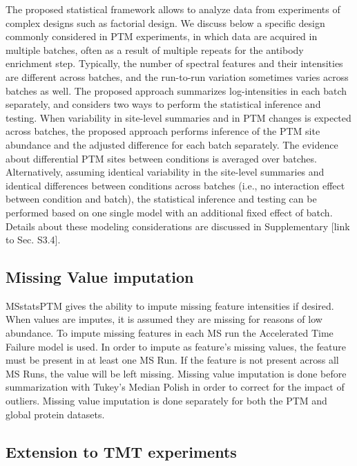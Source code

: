 \documentclass[mcp]{article}
\numberwithin{figure}{section} %
\numberwithin{table}{section}
\def\todo#1{{\color{red}[#1]}}
\begin{document}
The proposed statistical framework allows to analyze data from experiments of complex designs such as factorial design. We discuss below a specific design commonly considered in PTM experiments, in which data are acquired in multiple batches, often as a result of multiple repeats for the antibody enrichment step. Typically, the number of spectral features and their intensities are different across batches, and the run-to-run variation sometimes varies across batches as well. The proposed approach summarizes log-intensities in each batch separately, and considers two ways to perform the statistical inference and testing. When variability in site-level summaries and in PTM changes is expected across batches, the proposed approach performs inference of the PTM site abundance and the adjusted difference for each batch separately. The evidence about differential PTM sites between conditions is averaged over batches. Alternatively, assuming identical variability in the site-level summaries and identical differences between conditions across batches (i.e., no interaction effect between condition and batch), the statistical inference and testing can be performed based on one single model with an additional fixed effect of batch. Details about these modeling considerations are discussed in Supplementary \todo{link to Sec. S3.4}.

\subsection*{Missing Value imputation}

MSstatsPTM gives the ability to impute missing feature intensities if desired. When values are imputes, it is assumed they are missing for reasons of low abundance. To impute missing features in each MS run the Accelerated Time Failure model is used.\cite{Tukey:1977} In order to impute as feature's missing values, the feature must be present in at least one MS Run. If the feature is not present across all MS Runs, the value will be left missing. Missing value imputation is done before summarization with Tukey's Median Polish in order to correct for the impact of outliers. Missing value imputation is done separately for both the PTM and global protein datasets.

\subsection*{Extension to TMT experiments}
\end{document}

